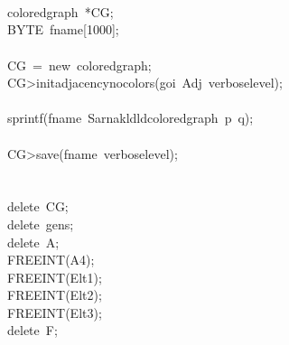 \begin{tabbing}
\\[0pt]
\\[0pt]
\\[0pt]
\>coloredgraph\ *CG;\\[0pt]
\>BYTE\ fname[1000];\\[0pt]
\\[0pt]
\>CG\ =\ new\ coloredgraph;\\[0pt]
\>CG>initadjacencynocolors(goi\ Adj\ verboselevel);\\[0pt]
\\[0pt]
\>sprintf(fname\ Sarnakldldcoloredgraph\ p\ q);\\[0pt]
\\[0pt]
\>CG>save(fname\ verboselevel);\\[0pt]
\\[0pt]
\\[0pt]
\>delete\ CG;\\[0pt]
\>delete\ gens;\\[0pt]
\>delete\ A;\\[0pt]
\>FREEINT(A4);\\[0pt]
\>FREEINT(Elt1);\\[0pt]
\>FREEINT(Elt2);\\[0pt]
\>FREEINT(Elt3);\\[0pt]
\>delete\ F;\\[0pt]
\\[0pt]
\\[0pt]
\\[0pt]
\\[0pt]
\end{tabbing}
